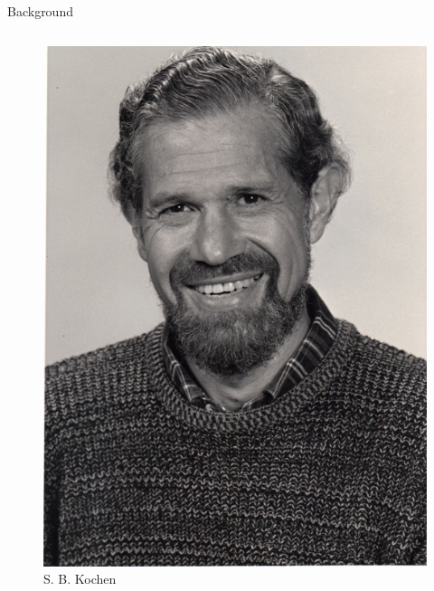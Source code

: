 \documentclass[final,hyperref={pdfpagelabels=false}]{beamer}
\begin{document}
\begin{frame}[t]
\begin{columns}[c]
\begin{column}{.32\textwidth}
\begin{block}{Background}
\begin{columns}
\begin{column}{0.3\textwidth}
\begin{figure}
              \includegraphics[width=0.8\linewidth]{kochen}
              \caption{S. B. Kochen}
            \end{figure}

          \end{column}
      \end{columns}



\end{block}
\end{column}
\end{columns}
\end{frame}
\end{document}
